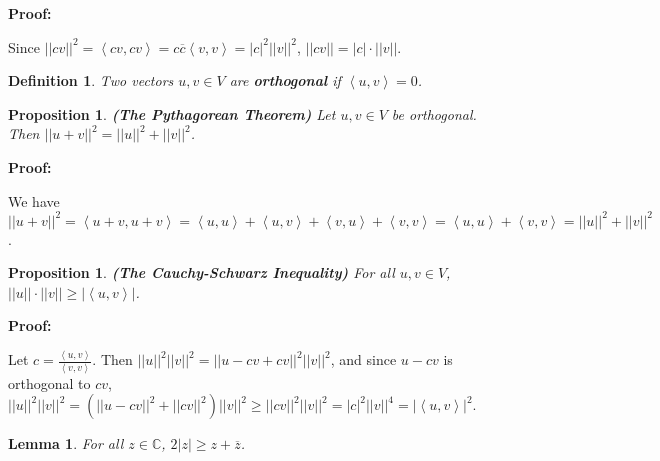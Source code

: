 \documentclass{article}
\theoremstyle{colontheorem}
\newtheorem{proposition}[theorem]{Proposition}
\newtheorem{definition}[theorem]{Definition}
\newtheorem{lemma}[theorem]{Lemma}
\newenvironment{Proposition}
{
	\begin{mdframed}[backgroundcolor=TheoremOrange!10]
	\begin{proposition}
}
{
	\end{proposition}
	\end{mdframed}
	
	\vspace{.15in}
}
\newenvironment{Def}
{
	\begin{mdframed}[backgroundcolor=DefGreen!10]
	\begin{definition}
}
{
	\end{definition}
	\end{mdframed}
	
	\vspace{.15in}
}
\newenvironment{Lemma}
{
	\begin{mdframed}[backgroundcolor=LemmaYellow!10]
	\begin{lemma}
}
{
	\end{lemma}
	\end{mdframed}
	
	\vspace{.15in}
}
\newenvironment{Proof}
{
	\vspace{-.3in}
	
	\begin{mdframed}[backgroundcolor=ProofPurple!10]
	\textbf{Proof:}%
}
{
	\end{mdframed}
	
	\vspace{.15in}
}
\begin{document}
\begin{Proof}
	Since $||cv||^2 = \left< cv, cv \right> = c \overline{c} \left< v, v \right> = |c|^2 ||v||^2$, $||cv|| = |c| \cdot ||v||$.
	
\end{Proof}



\begin{Def}
	
	Two vectors $u, v \in V$ are \textbf{orthogonal} if $\left< u, v \right> = 0$.
	
\end{Def}



\begin{Proposition}
	
	\textbf{(The Pythagorean Theorem)} Let $u, v \in V$ be orthogonal. Then $||u + v||^2 = ||u||^2 + ||v||^2$.
	
\end{Proposition}



\begin{Proof}
	We have $||u + v||^2 = \left< u+v, u+v \right> = \left< u, u \right> + \left< u, v \right> + \left< v, u \right> + \left< v, v \right> = \left< u, u \right> + \left< v, v \right> = ||u||^2 + ||v||^2$.
	
\end{Proof}



\begin{Proposition}
	
	\textbf{(The Cauchy-Schwarz Inequality)} For all $u, v \in V$, $||u|| \cdot ||v|| \geq | \left< u, v \right> |$.
	
\end{Proposition}



\begin{Proof}
	Let $c = \frac{\left< u, v \right>}{\left< v, v \right>}$. Then $||u||^2 ||v||^2 = ||u - cv + cv||^2 ||v||^2$, and since $u - cv$ is orthogonal to $cv$, $||u||^2 ||v||^2 = \left( ||u - cv||^2 + ||cv||^2 \right) ||v||^2 \geq ||cv||^2 ||v||^2 = |c|^2 ||v||^4 = | \left< u, v \right> |^2$.
	
\end{Proof}



\begin{Lemma}
	
	For all $z \in \mathbb{C}$, $2|z| \geq z + \overline{z}$.
	
\end{Lemma}
\end{document}
